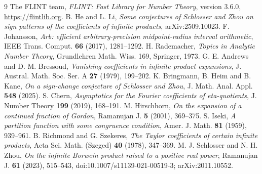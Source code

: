 \documentclass[11pt]{amsart}
\theoremstyle{remark}
\theoremstyle{definition}
\begin{document}
\begin{thebibliography}{9}
 The FLINT team, \emph{FLINT: Fast Library for Number Theory}, version 3.6.0, \url{https://flintlib.org}.
 B. He and L. Li, \emph{Some conjectures of Schlosser and Zhou on sign patterns of the coefficients of infinite products}, arXiv:2509.10023.
 F. Johansson, \emph{Arb: efficient arbitrary-precision midpoint-radius interval arithmetic}, IEEE Trans. Comput. \textbf{66} (2017), 1281--1292.
 H. Rademacher, \emph{Topics in Analytic Number Theory}, Grundlehren Math. Wiss. 169, Springer, 1973.
 G. E. Andrews and D. M. Bressoud, \emph{Vanishing coefficients in infinite product expansions}, J. Austral. Math. Soc. Ser. A \textbf{27} (1979), 199--202.
 K. Bringmann, B. Heim and B. Kane, \emph{On a sign-change conjecture of Schlosser and Zhou}, J. Math. Anal. Appl. \textbf{548} (2025).
 S. Chern, \emph{Asymptotics for the Fourier coefficients of eta-quotients}, J. Number Theory \textbf{199} (2019), 168--191.
 M. Hirschhorn, \emph{On the expansion of a continued fraction of Gordon}, Ramanujan J. \textbf{5} (2001), 369--375.
 S. Iseki, \emph{A partition function with some congruence condition}, Amer. J. Math. \textbf{81} (1959), 939--961.
 B. Richmond and G. Szekeres, \emph{The Taylor coefficients of certain infinite products}, Acta Sci. Math. (Szeged) \textbf{40} (1978), 347--369.
 M. J. Schlosser and N. H. Zhou, \emph{On the infinite Borwein product raised to a positive real power}, Ramanujan J. \textbf{61} (2023), 515--543, doi:10.1007/s11139-021-00519-3; arXiv:2011.10552.
\end{thebibliography}
\end{document}
